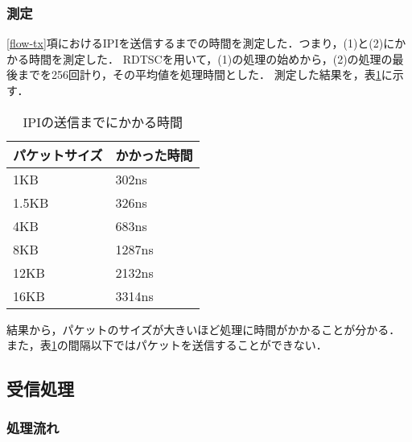 \documentclass[12pt]{jsarticle}
\begin{document}
\subsubsection{測定}

\ref{flow-tx}項におけるIPIを送信するまでの時間を測定した．つまり，(1)と(2)にかかる時間を測定した．
RDTSCを用いて，(1)の処理の始めから，(2)の処理の最後までを256回計り，その平均値を処理時間とした．
測定した結果を，表\ref{time-until-IPI}に示す．

\begin{table}[h]
    \caption{IPIの送信までにかかる時間}
    \label{time-until-IPI}
    \begin{center}
        \begin{tabular}{l|l}   \hline \hline 
            パケットサイズ & かかった時間 \\ \hline
            1KB            & 302ns        \\ 
            1.5KB          & 326ns        \\ 
            4KB            & 683ns        \\ 
            8KB            & 1287ns       \\ 
            12KB           & 2132ns       \\ 
            16KB           & 3314ns       \\ \hline
        \end{tabular}
    \end{center}
\end{table}

結果から，パケットのサイズが大きいほど処理に時間がかかることが分かる．
また，表\ref{time-until-IPI}の間隔以下ではパケットを送信することができない．

\subsection{受信処理}

\subsubsection{処理流れ}\label{flow-rx}
\end{document}
